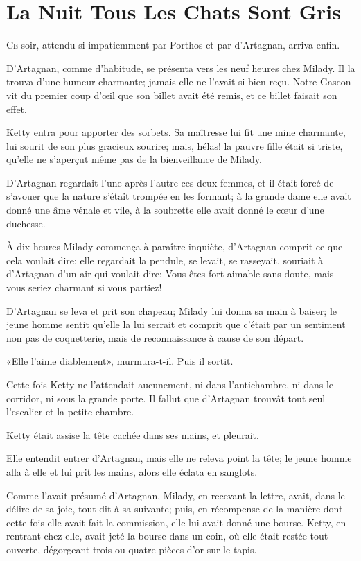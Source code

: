 
\chapter{La Nuit Tous Les Chats Sont Gris}

\lettrine{C}{e} soir, attendu si impatiemment par Porthos et par d'Artagnan, arriva enfin. 

\zz
D'Artagnan, comme d'habitude, se présenta vers les neuf heures chez Milady. Il la trouva d'une humeur charmante; jamais elle ne l'avait si bien reçu. Notre Gascon vit du premier coup d'œil que son billet avait été remis, et ce billet faisait son effet. 

Ketty entra pour apporter des sorbets. Sa maîtresse lui fit une mine charmante, lui sourit de son plus gracieux sourire; mais, hélas! la pauvre fille était si triste, qu'elle ne s'aperçut même pas de la bienveillance de Milady. 

D'Artagnan regardait l'une après l'autre ces deux femmes, et il était forcé de s'avouer que la nature s'était trompée en les formant; à la grande dame elle avait donné une âme vénale et vile, à la soubrette elle avait donné le cœur d'une duchesse. 

À dix heures Milady commença à paraître inquiète, d'Artagnan comprit ce que cela voulait dire; elle regardait la pendule, se levait, se rasseyait, souriait à d'Artagnan d'un air qui voulait dire: Vous êtes fort aimable sans doute, mais vous seriez charmant si vous partiez! 

D'Artagnan se leva et prit son chapeau; Milady lui donna sa main à baiser; le jeune homme sentit qu'elle la lui serrait et comprit que c'était par un sentiment non pas de coquetterie, mais de reconnaissance à cause de son départ. 

«Elle l'aime diablement», murmura-t-il. Puis il sortit. 

Cette fois Ketty ne l'attendait aucunement, ni dans l'antichambre, ni dans le corridor, ni sous la grande porte. Il fallut que d'Artagnan trouvât tout seul l'escalier et la petite chambre. 

Ketty était assise la tête cachée dans ses mains, et pleurait. 

Elle entendit entrer d'Artagnan, mais elle ne releva point la tête; le jeune homme alla à elle et lui prit les mains, alors elle éclata en sanglots. 

Comme l'avait présumé d'Artagnan, Milady, en recevant la lettre, avait, dans le délire de sa joie, tout dit à sa suivante; puis, en récompense de la manière dont cette fois elle avait fait la commission, elle lui avait donné une bourse. Ketty, en rentrant chez elle, avait jeté la bourse dans un coin, où elle était restée tout ouverte, dégorgeant trois ou quatre pièces d'or sur le tapis. 

